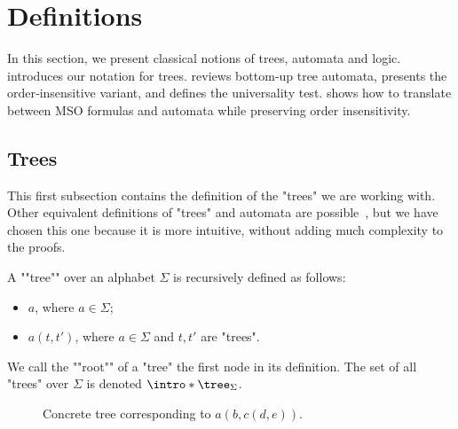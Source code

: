 \documentclass[a4paper,UKenglish,cleveref, autoref, thm-restate]{lipics-v2021}
\begin{document}
\section{Definitions}
\label{sec:definitions}

In this section, we present classical notions of trees, automata and logic.
 introduces our notation for trees.
 reviews bottom‐up tree automata,  presents the order‐insensitive variant,
and  defines the universality test.
 shows how to translate between MSO formulas and automata while preserving order insensitivity.


\subsection{Trees}\label{sec:trees}

This first subsection contains the definition of the "trees" we are working with. Other equivalent definitions of "trees" and
automata are possible~\cite{Thomas1997, tata}, but we have chosen this one because it is more intuitive, without adding much complexity to the proofs.

\begin{definition}["Tree"]
	\AP A ""tree"" over an alphabet $\Sigma$ is recursively defined as follows:
	\begin{itemize}
		\item $a$, where $a \in \Sigma$;
		\item $a(t,t')$, where $a \in \Sigma$ and $t, t'$ are "trees".
	\end{itemize}
	We call the ""root"" of a "tree" the first node in its definition.
	The set of all "trees" over $\Sigma$ is denoted $\intro* \tree_{\Sigma}$.
\end{definition}

\begin{figure}[h]
	\centering


	\caption{Concrete tree corresponding to $a(b, c(d, e))$.}
\end{figure}
\end{document}
